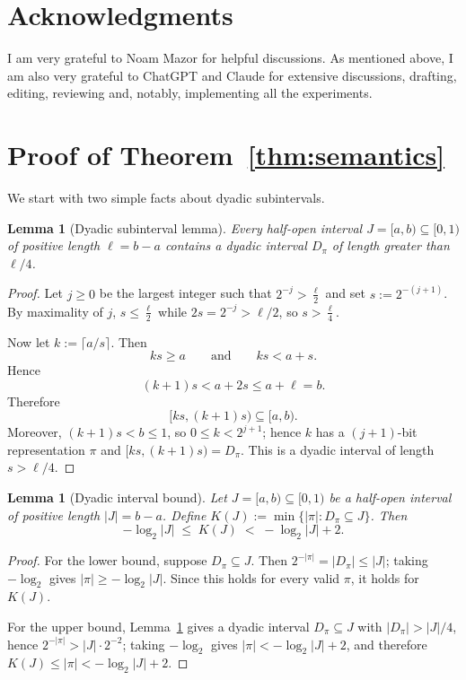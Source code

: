 \documentclass[letterpaper]{article} %
\newtheorem{lemma}[theorem]{Lemma}
\theoremstyle{definition}
\theoremstyle{remark}
\begin{document}
\section{Acknowledgments}
I am very grateful to Noam Mazor for helpful discussions. As mentioned above,
I am also very grateful to ChatGPT and Claude for extensive discussions,
drafting, editing, reviewing and, notably, implementing all the experiments.



\appendix

\section{Proof of Theorem~\ref{thm:semantics}}
\label{app:dyadic}

We start with two simple facts about dyadic subintervals.

\begin{lemma}[Dyadic subinterval lemma]\label{lem:subinterval}
Every half-open interval $J=[a,b)\subseteq[0,1)$ of positive length
$\ell=b-a$ contains a dyadic interval $D_\pi$ of length greater than
$\ell/4$.
\end{lemma}

\begin{proof}
Let $j\ge 0$ be the largest integer such that $
2^{-j}>\frac{\ell}{2}$
and set $s:=2^{-(j+1)}$. By maximality of $j$,
$s\le \frac{\ell}{2}$
while $2s=2^{-j}>\ell/2$, so $
s>\frac{\ell}{4}$.

Now let $k:=\lceil a/s\rceil$. Then
\[
ks\ge a
\qquad\text{and}\qquad
ks<a+s.
\]
Hence
\[
(k+1)s<a+2s\le a+\ell=b.
\]
Therefore
\[
[ks,(k+1)s)\subseteq[a,b).
\]
Moreover, $(k+1)s<b\le1$, so $0\le k<2^{j+1}$; hence $k$ has a
$(j+1)$-bit representation $\pi$ and $[ks,(k+1)s)=D_\pi$. This is a dyadic
interval of length $s>\ell/4$.
\end{proof}

\begin{lemma}[Dyadic interval bound]\label{thm:dyadic}
Let $J = [a,b) \subseteq [0,1)$ be a half-open interval of positive length
$|J| = b-a$. Define $K(J) := \min\{ |\pi| : D_\pi \subseteq J \}$. Then
\begin{equation}\label{eq:dyadicbound}
-\log_2 |J| \;\le\; K(J) \;<\; -\log_2 |J| + 2.
\end{equation}
\end{lemma}

\begin{proof}
For the lower bound, suppose $D_\pi \subseteq J$. Then
$2^{-|\pi|} = |D_\pi| \le |J|$; taking $-\log_2$ gives $|\pi| \ge -\log_2 |J|$.
Since this holds for every valid $\pi$, it holds for $K(J)$.

For the upper bound, Lemma~\ref{lem:subinterval} gives a dyadic interval
$D_\pi \subseteq J$ with $|D_\pi| > |J|/4$, hence
$2^{-|\pi|} > |J| \cdot 2^{-2}$; taking $-\log_2$ gives
$|\pi| < -\log_2 |J| + 2$, and therefore $K(J) \le |\pi| < -\log_2 |J| + 2$.
\end{proof}
\end{document}
